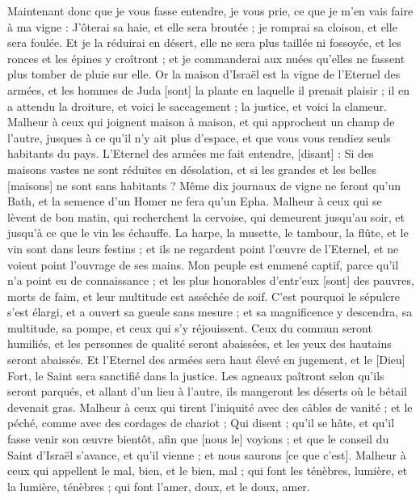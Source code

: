 \begin{multicols}{2}
Maintenant donc que je vous fasse entendre, je vous prie, ce que je m'en vais faire à ma vigne : J'ôterai sa haie, et elle sera broutée ; je romprai sa cloison, et elle sera foulée.
Et je la réduirai en désert, elle ne sera plus taillée ni fossoyée, et les ronces et les épines y croîtront ; et je commanderai aux nuées qu'elles ne fassent plus tomber de pluie sur elle.
Or la maison d'Israël est la vigne de l'Eternel des armées, et les hommes de Juda [sont] la plante en laquelle il prenait plaisir ; il en a attendu la droiture, et voici le saccagement ; la justice, et voici la clameur.
Malheur à ceux qui joignent maison à maison, et qui approchent un champ de l'autre, jusques à ce qu'il n'y ait plus d'espace, et que vous vous rendiez seuls habitants du pays.
L'Eternel des armées me fait entendre, [disant] : Si des maisons vastes ne sont réduites en désolation, et si les grandes et les belles [maisons] ne sont sans habitants ?
Même dix journaux de vigne ne feront qu'un Bath, et la semence d'un Homer ne fera qu'un Epha.
Malheur à ceux qui se lèvent de bon matin, qui recherchent la cervoise, qui demeurent jusqu'au soir, et jusqu'à ce que le vin les échauffe.
La harpe, la musette, le tambour, la flûte, et le vin sont dans leurs festins ; et ils ne regardent point l'œuvre de l'Eternel, et ne voient point l'ouvrage de ses mains.
Mon peuple est emmené captif, parce qu'il n'a point eu de connaissance ; et les plus honorables d'entr'eux [sont] des pauvres, morts de faim, et leur multitude est asséchée de soif.
C'est pourquoi le sépulcre s'est élargi, et a ouvert sa gueule sans mesure ; et sa magnificence y descendra, sa multitude, sa pompe, et ceux qui s'y réjouissent.
Ceux du commun seront humiliés, et les personnes de qualité seront abaissées, et les yeux des hautains seront abaissés.
Et l'Eternel des armées sera haut élevé en jugement, et le [Dieu] Fort, le Saint sera sanctifié dans la justice.
Les agneaux paîtront selon qu'ils seront parqués, et allant d'un lieu à l'autre, ils mangeront les déserts où le bétail devenait gras.
Malheur à ceux qui tirent l'iniquité avec des câbles de vanité ; et le péché, comme avec des cordages de chariot ;
Qui disent ; qu'il se hâte, et qu'il fasse venir son œuvre bientôt, afin que [nous le] voyions ; et que le conseil du Saint d'Israël s'avance, et qu'il vienne ; et nous saurons [ce que c'est].
Malheur à ceux qui appellent le mal, bien, et le bien, mal ; qui font les ténèbres, lumière, et la lumière, ténèbres ; qui font l'amer, doux, et le doux, amer.

\end{multicols}
